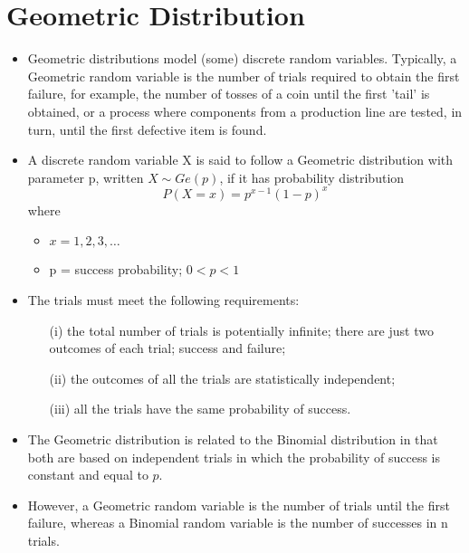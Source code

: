 \documentclass[]{report}
\begin{document}
\chapter{Geometric Distribution}
\begin{itemize}
	\item Geometric distributions model (some) discrete random variables. Typically, a Geometric random variable is the number of trials required to obtain the first failure, for example, the number of tosses of a coin until the first 'tail' is obtained, or a process where components from a production line are tested, in turn, until the first defective item is found.
	
	\item A discrete random variable X is said to follow a Geometric distribution with parameter p, written $X \sim Ge(p)$, if it has probability distribution
	\[P(X=x) = p^{x-1}(1-p)^x\]
	where
	\begin{itemize}
		\item $x = 1, 2, 3, \ldots$
		\item p = success probability; $0 < p < 1$
	\end{itemize}
	\item	The trials must meet the following requirements:
	
	\begin{itemize}
		\item[(i)] the total number of trials is potentially infinite;
		there are just two outcomes of each trial; success and failure;
		\item[(ii)] the outcomes of all the trials are statistically independent;
		\item[(iii)] all the trials have the same probability of success.
	\end{itemize}
	
	\item	The Geometric distribution is related to the Binomial distribution in that both are based on independent trials in which the probability of success is constant and equal to $p$. 
	
	\item However, a Geometric random variable is the number of trials until the first failure, whereas a Binomial random variable is the number of successes in n trials.
\end{itemize}
\end{document}
